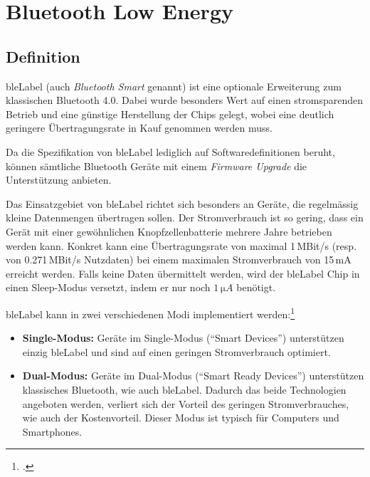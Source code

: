 \chapter{Bluetooth Low Energy}
\label{ch:ble}


\section{Definition}
\gls{bleLabel} (auch \textit{Bluetooth Smart} genannt) ist eine optionale Erweiterung zum klassischen Bluetooth 4.0.
Dabei wurde besonders Wert auf einen stromsparenden Betrieb und eine günstige Herstellung der Chips gelegt, wobei eine deutlich geringere Übertragungsrate in Kauf genommen werden muss.

Da die Spezifikation von \gls{bleLabel} lediglich auf Softwaredefinitionen beruht, können sämtliche Bluetooth Geräte mit einem \textit{Firmware Upgrade} die Unterstützung anbieten.

Das Einsatzgebiet von \gls{bleLabel} richtet sich besonders an Geräte, die regelmässig kleine Datenmengen übertragen sollen.
Der Stromverbrauch ist so gering, dass ein Gerät mit einer gewöhnlichen Knopfzellenbatterie mehrere Jahre betrieben werden kann. Konkret kann eine Übertragungsrate von maximal 1\,MBit/s (resp. von 0.271\,MBit/s Nutzdaten) bei einem maximalen Stromverbrauch von 15\,mA erreicht werden.
Falls keine Daten übermittelt werden, wird der \gls{bleLabel} Chip in einen Sleep-Modus versetzt, indem er nur noch $1\,\si{\micro A}$ benötigt.

\gls{bleLabel} kann in zwei verschiedenen Modi implementiert werden:\footcite{Bluetooth_Low_Energy_vs_Classic_Bluetooth_Medical_Electronics_Design_2015-04-27}
\begin{itemize}
	\item \textbf{Single-Modus:} Geräte im Single-Modus ("`Smart Devices"') unterstützen einzig \gls{bleLabel} und sind auf einen geringen Stromverbrauch optimiert.
	\item \textbf{Dual-Modus:} Geräte im Dual-Modus ("`Smart Ready Devices"') unterstützen klassisches Bluetooth, wie auch \gls{bleLabel}. Dadurch das beide Technologien angeboten werden, verliert sich der Vorteil des geringen Stromverbrauches, wie auch der Kostenvorteil. Dieser Modus ist typisch für Computers und Smartphones.
\end{itemize}


